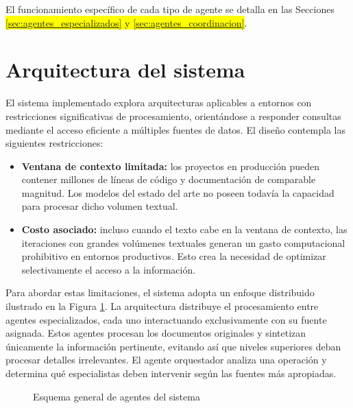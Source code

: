 El funcionamiento específico de cada tipo de agente se detalla en las Secciones \colorbox{yellow}{\ref{sec:agentes_especializados} y \ref{sec:agentes_coordinacion}}.

\section{Arquitectura del sistema}
El sistema implementado explora arquitecturas aplicables a entornos con restricciones significativas de procesamiento, orientándose a responder consultas mediante el acceso eficiente a múltiples fuentes de datos. El diseño contempla las siguientes restricciones:
\begin{itemize}
\item\textbf{Ventana de contexto limitada: }los proyectos en producción pueden contener millones de líneas de código y documentación de comparable magnitud. Los modelos del estado del arte no poseen todavía la capacidad para procesar dicho volumen textual.
\item\textbf{Costo asociado: }incluso cuando el texto cabe en la ventana de contexto, las iteraciones con grandes volúmenes textuales generan un gasto computacional prohibitivo en entornos productivos. Esto crea la necesidad de optimizar selectivamente el acceso a la información.
\end{itemize}
Para abordar estas limitaciones, el sistema adopta un enfoque distribuido ilustrado en la Figura \ref{fig:agentes}. La arquitectura distribuye el procesamiento entre agentes especializados, cada uno interactuando exclusivamente con su fuente asignada.
Estos agentes procesan los documentos originales y sintetizan únicamente la información pertinente, evitando así que niveles superiores deban procesar detalles irrelevantes. El agente orquestador analiza una operación y determina qué especialistas deben intervenir según las fuentes más apropiadas.
\begin{figure}[h]
\centering
{}
\caption{Esquema general de agentes del sistema}
\label{fig:agentes}
\end{figure}

